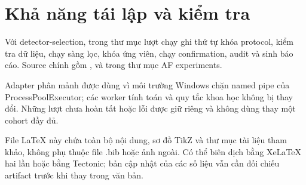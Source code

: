 \documentclass[12pt,a4paper,oneside]{report}
\begin{document}
\section{Khả năng tái lập và kiểm tra}
Với detector-selection,  trong thư mục lượt chạy ghi thứ tự khóa protocol, kiểm tra dữ liệu, chạy sàng lọc, khóa ứng viên, chạy confirmation, audit và sinh báo cáo. Source chính gồm ,  và  trong thư mục AF experiments.

Adapter phân mảnh được dùng vì môi trường Windows chặn named pipe của ProcessPoolExecutor; các worker tính toán và quy tắc khoa học không bị thay đổi. Những lượt chưa hoàn tất hoặc lỗi được giữ riêng và không dùng thay một cohort đầy đủ.

File LaTeX này chứa toàn bộ nội dung, sơ đồ TikZ và thư mục tài liệu tham khảo, không phụ thuộc file .bib hoặc ảnh ngoài. Có thể biên dịch bằng XeLaTeX hai lần hoặc bằng Tectonic; bản cập nhật của các số liệu vẫn cần đối chiếu artifact trước khi thay trong văn bản.
\end{document}
